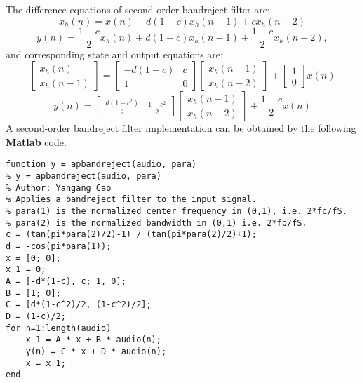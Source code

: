 \documentclass[10pt,a4paper,oneside]{article}
\begin{document}
The difference equations of second-order bandreject filter are: 
\[
x_h(n) = x(n) - d(1-c)x_h(n-1) + cx_h(n-2)
\]
\[
y(n) = \frac{1-c}{2}x_h(n) + d(1-c)x_h(n-1) + \frac{1-c}{2}x_h(n-2),
\]
and corresponding state and output equations are:
\[
\begin{bmatrix}x_h(n)\\x_h(n-1)\end{bmatrix} = \begin{bmatrix}
-d(1-c)&c\\
1&0
\end{bmatrix}
\begin{bmatrix}x_h(n-1)\\x_h(n-2)\end{bmatrix} + \begin{bmatrix}1\\0\end{bmatrix}
x(n)\]
\[
y(n) = \begin{bmatrix}\frac{d(1-c^2)}{2}&\frac{1-c^2}{2}\end{bmatrix}
\begin{bmatrix}x_h(n-1)\\x_h(n-2)\end{bmatrix} + \frac{1-c}{2}x(n)
\]
A second-order bandreject filter implementation can be obtained by the following {\bfseries Matlab} code.
\begin{lstlisting}
function y = apbandreject(audio, para)
% y = apbandreject(audio, para)
% Author: Yangang Cao
% Applies a bandreject filter to the input signal.
% para(1) is the normalized center frequency in (0,1), i.e. 2*fc/fS.
% para(2) is the normalized bandwidth in (0,1) i.e. 2*fb/fS.
c = (tan(pi*para(2)/2)-1) / (tan(pi*para(2)/2)+1);
d = -cos(pi*para(1));
x = [0; 0];
x_1 = 0;
A = [-d*(1-c), c; 1, 0];
B = [1; 0];
C = [d*(1-c^2)/2, (1-c^2)/2];
D = (1-c)/2;
for n=1:length(audio)
	x_1 = A * x + B * audio(n);
	y(n) = C * x + D * audio(n);
	x = x_1;
end
\end{lstlisting}
\end{document}
